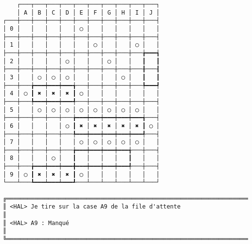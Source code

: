 {\scriptsize
\begin{verbatim}
    ┌───┬───┬───┬───┬───┬───┬───┬───┬───┬───┐
    │ A │ B │ C │ D │ E │ F │ G │ H │ I │ J │
┌───┼───┼───┼───┼───┼───┼───┼───┼───┼───┼───┤
│ 0 │   │   │   │   │ ◯ │   │   │   │   │   │
├───┼───┼───┼───┼───┼───┼───┼───┼───┼───┼───┤
│ 1 │   │   │   │   │   │ ◯ │   │   │ ◯ │   │
├───┼───┼───┼───┼───┼───┼───┼───┼───┼───╆━━━┪
│ 2 │   │   │   │ ◯ │   │   │ ◯ │   │   ┃   ┃
├───┼───┼───┼───┼───┼───┼───┼───┼───┼───╂───┨
│ 3 │   │ ◯ │ ◯ │ ◯ │   │   │   │ ◯ │   ┃   ┃
├───┼───╆━━━┿━━━┿━━━╅───┼───┼───┼───┼───╄━━━┩
│ 4 │ ◯ ┃ ✖ │ ✖ │ ✖ ┃ ◯ │   │   │   │   │   │
├───┼───╄━━━┿━━━┿━━━╃───┼───┼───┼───┼───┼───┤
│ 5 │   │ ◯ │ ◯ │ ◯ │ ◯ │ ◯ │ ◯ │ ◯ │ ◯ │   │
├───┼───┼───┼───┼───╆━━━┿━━━┿━━━┿━━━┿━━━╅───┤
│ 6 │   │   │   │ ◯ ┃ ✖ │ ✖ │ ✖ │ ✖ │ ✖ ┃ ◯ │
├───┼───┼───┼───┼───╄━━━┿━━━┿━━━┿━━━┿━━━╃───┤
│ 7 │   │   │   │   │ ◯ │ ◯ │ ◯ │ ◯ │ ◯ │   │
├───┼───┼───┼───┼───╆━━━┿━━━┿━━━┿━━━╅───┼───┤
│ 8 │   │   │ ◯ │   ┃   │   │   │   ┃   │   │
├───┼───╆━━━┿━━━┿━━━╋━━━┿━━━┿━━━┿━━━╃───┼───┤
│ 9 │ ◯ ┃ ✖ │ ✖ │ ✖ ┃ ◯ │   │   │   │   │   │
└───┴───┺━━━┷━━━┷━━━┹───┴───┴───┴───┴───┴───┘

╔══════════════════════════════════════════════════════════════════════════════════════════════════╗
║ <HAL> Je tire sur la case A9 de la file d'attente                                                ║
║ <HAL> A9 : Manqué                                                                                ║
╚══════════════════════════════════════════════════════════════════════════════════════════════════╝
\end{verbatim}}
\newpage

